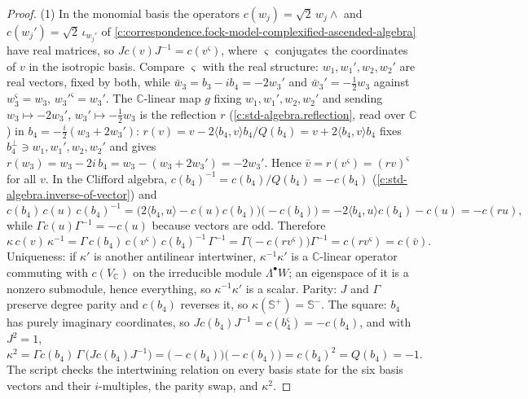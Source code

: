 \documentclass[11pt]{article}
\theoremstyle{definition}
\theoremstyle{plain}
\providecommand{\C}{}\renewcommand{\C}{\mathbb{C}}
\providecommand{\CS}{}\renewcommand{\CS}{{\mathbb{S}^{+}}}
\providecommand{\CSm}{}\renewcommand{\CSm}{{\mathbb{S}^{-}}}
\providecommand{\ip}{}\renewcommand{\ip}[2]{\langle #1, #2\rangle}
\begin{document}
\begin{proof}
(1) In the monomial basis the operators $c(w_j) = \sqrt2\,w_j\wedge$ and $c(w_j') = \sqrt2\,\iota_{w_j'}$ of \ref{c:correspondence.fock-model-complexified-ascended-algebra} have real matrices, so $J c(v) J^{-1} = c(v^\varsigma)$, where $\varsigma$ conjugates the coordinates of $v$ in the isotropic basis. Compare $\varsigma$ with the real structure: $w_1, w_1', w_2, w_2'$ are real vectors, fixed by both, while $\bar w_3 = b_3 - ib_4 = -2w_3'$ and $\bar w_3' = -\tfrac12 w_3$ against $w_3^\varsigma = w_3$, $w_3'^\varsigma = w_3'$. The $\C$-linear map $g$ fixing $w_1, w_1', w_2, w_2'$ and sending $w_3 \mapsto -2w_3'$, $w_3' \mapsto -\tfrac12 w_3$ is the reflection $r$ (\ref{c:std-algebra.reflection}, read over $\C$) in $b_4 = -\tfrac{i}{2}(w_3 + 2w_3')$: $r(v) = v - 2\ip{b_4}{v}b_4/Q(b_4) = v + 2\ip{b_4}{v}b_4$ fixes $b_4^\perp \ni w_1, w_1', w_2, w_2'$ and gives $r(w_3) = w_3 - 2i\,b_4 = w_3 - (w_3 + 2w_3') = -2w_3'$. Hence $\bar v = r(v^\varsigma) = (rv)^\varsigma$ for all $v$. In the Clifford algebra, $c(b_4)^{-1} = c(b_4)/Q(b_4) = -c(b_4)$ (\ref{c:std-algebra.inverse-of-vector}) and
\[
c(b_4)\,c(u)\,c(b_4)^{-1} = \bigl(2\ip{b_4}{u} - c(u)c(b_4)\bigr)\bigl(-c(b_4)\bigr) = -2\ip{b_4}{u}c(b_4) - c(u) = -c(ru),
\]
while $\Gamma c(u)\Gamma^{-1} = -c(u)$ because vectors are odd. Therefore
\[
\kappa\,c(v)\,\kappa^{-1} = \Gamma\,c(b_4)\,c(v^\varsigma)\,c(b_4)^{-1}\,\Gamma^{-1} = \Gamma\bigl(-c(r v^\varsigma)\bigr)\Gamma^{-1} = c(r v^\varsigma) = c(\bar v).
\]
Uniqueness: if $\kappa'$ is another antilinear intertwiner, $\kappa^{-1}\kappa'$ is a $\C$-linear operator commuting with $c(V_\C)$ on the irreducible module $\Lambda^\bullet W$; an eigenspace of it is a nonzero submodule, hence everything, so $\kappa^{-1}\kappa'$ is a scalar. Parity: $J$ and $\Gamma$ preserve degree parity and $c(b_4)$ reverses it, so $\kappa(\CS) = \CSm$. The square: $b_4$ has purely imaginary coordinates, so $J c(b_4) J^{-1} = c(b_4^\varsigma) = -c(b_4)$, and with $J^2 = 1$,
\[
\kappa^2 = \Gamma c(b_4)\,\Gamma\,\bigl(J c(b_4) J^{-1}\bigr) = \bigl(-c(b_4)\bigr)\bigl(-c(b_4)\bigr) = c(b_4)^2 = Q(b_4) = -1 .
\]
The script checks the intertwining relation on every basis state for the six basis vectors and their $i$-multiples, the parity swap, and $\kappa^2$.


\end{proof}
\end{document}
